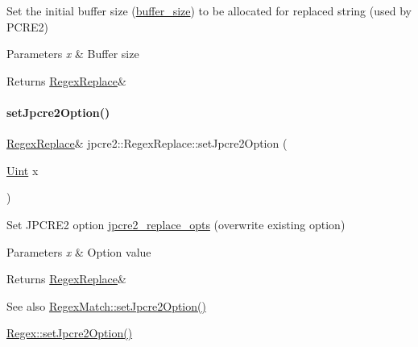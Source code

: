 Set the initial buffer size (\hyperlink{classjpcre2_1_1RegexReplace_a44abce541819ceb51e342411b48e95cb_a44abce541819ceb51e342411b48e95cb}{buffer\+\_\+size}) to be allocated for replaced string (used by P\+C\+R\+E2) 


\begin{DoxyParams}{Parameters}
{\em x} & Buffer size \\
\hline
\end{DoxyParams}
\begin{DoxyReturn}{Returns}
\hyperlink{classjpcre2_1_1RegexReplace}{Regex\+Replace}\& 
\end{DoxyReturn}
\hypertarget{classjpcre2_1_1RegexReplace_a745ab0b979035214a83ed0a04686ef6a_a745ab0b979035214a83ed0a04686ef6a}{}\label{classjpcre2_1_1RegexReplace_a745ab0b979035214a83ed0a04686ef6a_a745ab0b979035214a83ed0a04686ef6a} 
\paragraph{\texorpdfstring{set\+Jpcre2\+Option()}{setJpcre2Option()}}
{\footnotesize\ttfamily \hyperlink{classjpcre2_1_1RegexReplace}{Regex\+Replace}\& jpcre2\+::\+Regex\+Replace\+::set\+Jpcre2\+Option (\begin{DoxyParamCaption}\item[{\hyperlink{namespacejpcre2_a078242d38221a13fb3543b9edd78c099}{Uint}}]{x }\end{DoxyParamCaption})\hspace{0.3cm}{\ttfamily [inline]}}



Set J\+P\+C\+R\+E2 option \hyperlink{classjpcre2_1_1RegexReplace_acf13bcb16918df4b7bcaa7e49a1c7d59}{jpcre2\+\_\+replace\+\_\+opts} (overwrite existing option) 


\begin{DoxyParams}{Parameters}
{\em x} & Option value \\
\hline
\end{DoxyParams}
\begin{DoxyReturn}{Returns}
\hyperlink{classjpcre2_1_1RegexReplace}{Regex\+Replace}\& 
\end{DoxyReturn}
\begin{DoxySeeAlso}{See also}
\hyperlink{classjpcre2_1_1RegexMatch_a0d76033d9c134caa9ddfc21849603920_a0d76033d9c134caa9ddfc21849603920}{Regex\+Match\+::set\+Jpcre2\+Option()} 

\hyperlink{classjpcre2_1_1Regex_a031617a19638ef752dcd2b29fa3464d5_a031617a19638ef752dcd2b29fa3464d5}{Regex\+::set\+Jpcre2\+Option()} 
\end{DoxySeeAlso}
\hypertarget{classjpcre2_1_1RegexReplace_ae2abe2994b0fbe54950f88e63000c910_ae2abe2994b0fbe54950f88e63000c910}{}\label{classjpcre2_1_1RegexReplace_ae2abe2994b0fbe54950f88e63000c910_ae2abe2994b0fbe54950f88e63000c910} 
